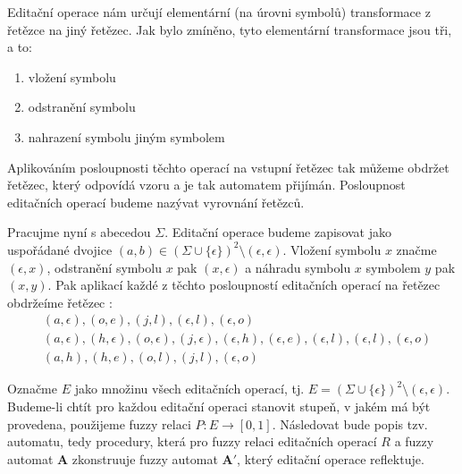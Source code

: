 \documentclass[a4paper,10pt]{article}
\begin{document}
Editační operace nám určují elementární (na úrovni symbolů) transformace z řetězce na jiný řetězec. Jak bylo zmíněno, tyto elementární transformace jsou tři, a to:
\begin{enumerate}
 \item vložení symbolu
 \item odstranění symbolu
 \item nahrazení symbolu jiným symbolem
\end{enumerate}

Aplikováním posloupnosti těchto operací na vstupní řetězec tak můžeme obdržet řetězec, který odpovídá vzoru a je tak automatem přijímán. Posloupnost editačních operací budeme nazývat vyrovnání řetězců.

Pracujme nyní s abecedou $\Sigma$. Editační operace budeme zapisovat jako uspořádané dvojice $(a, b) \in (\Sigma \cup \{ \epsilon \})^2 \setminus (\epsilon, \epsilon)$. Vložení symbolu $x$ značme $(\epsilon, x)$, odstranění symbolu $x$ pak $(x, \epsilon)$ a náhradu symbolu $x$ symbolem $y$ pak $(x, y)$.  Pak aplikací každé z těchto posloupností editačních operací na řetězec  obdržeíme řetězec :
\begin{align*}
 & (a,\epsilon), (o,e), (j,l), (\epsilon,l), (\epsilon, o) \\
 & (a, \epsilon), (h,\epsilon), (o,\epsilon), (j,\epsilon), (\epsilon,h), (\epsilon,e), (\epsilon,l), (\epsilon,l), (\epsilon,o) \\
 & (a,h), (h,e), (o,l), (j,l), (\epsilon,o) 
\end{align*}

Označme $E$ jako množinu všech editačních operací, tj. $E = (\Sigma \cup \{ \epsilon \})^2 \setminus (\epsilon, \epsilon)$. Budeme-li chtít pro každou editační operaci stanovit stupeň, v jakém má být provedena, použijeme fuzzy relaci  $P: E \rightarrow [0, 1]$. Následovat bude popis tzv.  automatu, tedy procedury, která pro fuzzy relaci editačních operací $R$ a fuzzy automat $\mathbf{A}$ zkonstruuje fuzzy automat $\mathbf{A}'$, který editační operace reflektuje.
\end{document}
